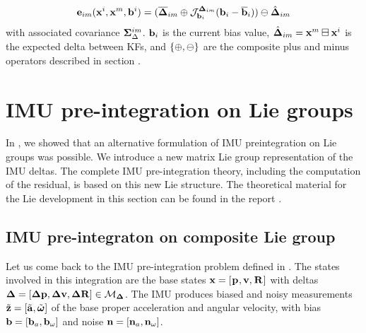 
\begin{align}
    {\bf e}_{im}({\bf x}^i, {\bf x}^m, {\bf b}^i) = (\overline{{\bm \Delta}}_{im} \oplus {\mathcal{J}^{{\bm \Delta}_{im}}_{{\bf b}_i}}({\bf b}_i-\overline{{\bf b}}_i) ) \ominus \hat{{\bm \Delta}}_{im}
    \label{eq:preint_residual}
\end{align}
%
with associated covariance ${\bm \Sigma}_\Delta^{im}$.
${\bf b}_i$ is the current bias value,  $\hat{{\bm \Delta}}_{im}={\bf x}^m\boxminus{\bf x}^i$ is the expected delta between KFs, and $\{\oplus,\ominus\}$ are the composite
 plus and minus operators described in section . 



%
%
%
%
\section{IMU pre-integration on Lie groups}
In \cite{fourmy2019absolute}, we showed that an alternative formulation of IMU preintegration on Lie groups was possible.
We introduce a new matrix Lie group representation of the IMU deltas. The complete IMU pre-integration theory,
including the computation of the residual, is based on this new Lie structure. The theoretical material for the Lie
development in this section can be found in the report \cite{sola2018micro}.

\subsection{IMU pre-integraton on composite Lie group \cite{forster2015imu}}

Let us come back to the IMU pre-integration problem defined in .
The states involved in this integration are the base states ${\bf x} = [\prescript{}{}{{\bf p}}_{}, {\bf v}, \prescript{}{}{{\bf R}}_{}]$ with deltas ${\bm \Delta}=[{\bm \Delta {\bf p}},{\bm \Delta {\bf v}},{\bm \Delta {\bf R}}] \in \mathcal{M}_{{\bm \Delta}}$. 
The IMU produces biased and noisy measurements $\tilde{{\bf z}} = [\tilde{{\bf a}}, \tilde{{\bm \omega}}]$ of the base proper acceleration and angular velocity, 
with bias ${\bf b} = [{\bf b}_{a}, {\bf b}_{\omega}]$ and noise ${\bf n} = [{\bf n}_{a}, {\bf n}_{\omega}]$. 

